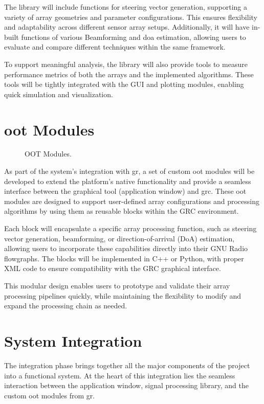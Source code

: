 The library will include functions for steering vector generation, supporting a variety of array geometries and parameter configurations. This ensures flexibility and adaptability across different sensor array setups. Additionally, it will have in-built functions of various Beamforming and \ac{doa} estimation, allowing users to evaluate and compare different techniques within the same framework.

To support meaningful analysis, the library will also provide tools to measure performance metrics of both the arrays and the implemented algorithms. These tools will be tightly integrated with the GUI and plotting modules, enabling quick simulation and visualization.

\section{\ac{oot} Modules}

\begin{figure} [h]
	\centering
	\caption{OOT Modules.}
\end{figure}

As part of the system’s integration with \acl{gr}, a set of custom \ac{oot} modules will be developed to extend the platform’s native functionality and provide a seamless interface between the graphical tool (application window) and \acf{grc}. These \ac{oot} modules are designed to support user-defined array configurations and processing algorithms by using them as reusable blocks within the GRC environment.

Each block will encapsulate a specific array processing function, such as steering vector generation, beamforming, or direction-of-arrival (DoA) estimation, allowing users to incorporate these capabilities directly into their GNU Radio flowgraphs. The blocks will be implemented in C++ or Python, with proper XML code to ensure compatibility with the GRC graphical interface.

This modular design enables users to prototype and validate their array processing pipelines quickly, while maintaining the flexibility to modify and expand the processing chain as needed.

\section{System Integration}

The integration phase brings together all the major components of the project into a functional system. At the heart of this integration lies the seamless interaction between the application window, signal processing library, and the custom \ac{oot} modules from \ac{gr}.

